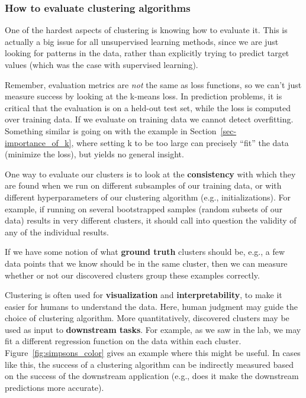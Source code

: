 

\subsubsection{How to evaluate clustering algorithms}
\label{sec-eval}

One of the hardest aspects of clustering is knowing how to evaluate
it. This is actually a big issue for all unsupervised learning
methods, since we are just looking for patterns in the data, rather
than explicitly trying to predict target values (which was the case
with supervised learning).

Remember, evaluation metrics are \textit{not} the same as loss
functions, so we can't just measure success by looking at the k-means
loss. In prediction problems, it is critical that the evaluation is on
a held-out test set, while the loss is computed over training data. If
we evaluate on training data we cannot detect overfitting. Something
similar is going on with the example in
Section~\ref{sec-importance_of_k}, where setting k to be too large can
precisely ``fit'' the data (minimize the loss), but yields no general
insight.

One way to evaluate our clusters is to look at the
\textbf{consistency} with which they are found when we run on
different subsamples of our training data, or with different
hyperparameters of our clustering algorithm (e.g.,
initializations). For example, if running on several bootstrapped
samples (random subsets of our data) results in very different
clusters, it should call into question the validity of any of the
individual results.

If we have some notion of what \textbf{ground truth} clusters should
be, e.g., a few data points that we know should be in the same
cluster, then we can measure whether or not our discovered clusters
group these examples correctly.

Clustering is often used for \textbf{visualization} and
\textbf{interpretability}, to make it easier for humans to understand
the data. Here, human judgment may guide the choice of clustering
algorithm. More quantitatively, discovered clusters may be used as input to
\textbf{downstream tasks}. For example, as we saw in the lab, we may fit a different
regression function on the data within each
cluster. Figure~\ref{fig:simpsons_color} gives
an example where this might be useful. In cases like this, the success
of a clustering algorithm can be indirectly measured based on the
success of the downstream application (e.g., does it make the
downstream predictions more accurate).

